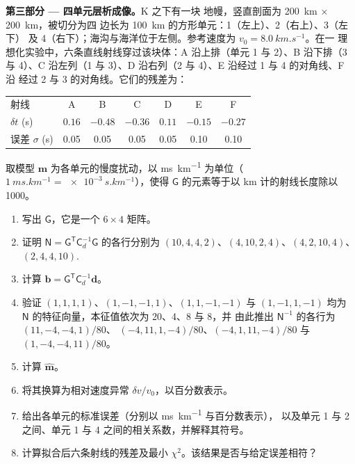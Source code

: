 \begin{problem}
\noindent\textbf{第三部分 --- 四单元层析成像。}K 之下有一块
地幔，竖直剖面为 \qty{200}{km} × \qty{200}{km}，被切分为四
边长为 \qty{100}{km} 的方形单元：1（左上）、2（右上）、3（左下）
及 4（右下）；海沟与海洋位于左侧。参考速度为 $v_0 = \qty{8.0}{km.s^{-1}}$。在一
理想化实验中，六条直线射线穿过该块体：A 沿上排（单元 1
与 2）、B 沿下排（3 与 4）、C 沿左列（1 与 3）、D
沿右列（2 与 4）、E 沿经过 1 与 4 的对角线、F 沿
经过 2 与 3 的对角线。它们的残差为：
\begin{center}
\small
\begin{tabular}{lcccccc}
\hline
射线 & A & B & C & D & E & F \\
$\delta t$ (\unit{s}) & $0.16$ & $-0.48$ & $-0.36$ & $0.11$ & $-0.15$ & $-0.27$ \\
误差 $\sigma$ (\unit{s}) & 0.05 & 0.05 & 0.05 & 0.05 & 0.10 & 0.10 \\
\hline
\end{tabular}
\end{center}
取模型 $\mathbf m$ 为各单元的慢度扰动，以
\unit{ms.km^{-1}} 为单位（$\qty{1}{ms.km^{-1}} = \qty{e-3}{s.km^{-1}}$），使得
$\mathsf G$ 的元素等于以 \unit{km} 计的射线长度除以 1000。
\begin{enumerate}[resume]
  \item 写出 $\mathsf G$，它是一个 $6\times4$ 矩阵。
  \item 证明 $\mathsf N = \mathsf G^{\mathsf T}\mathsf C_d^{-1}\mathsf G$
        的各行分别为 $(10, 4, 4, 2)$、$(4, 10, 2, 4)$、$(4, 2, 10, 4)$、
        $(2, 4, 4, 10)$.
  \item 计算 $\mathbf b = \mathsf G^{\mathsf T}\mathsf C_d^{-1}\mathbf d$。
  \item 验证 $(1,1,1,1)$、$(1,-1,-1,1)$、$(1,1,-1,-1)$ 与 $(1,-1,1,-1)$
        均为 $\mathsf N$ 的特征向量，本征值依次为 20、4、8 与 8，并
        由此推出 $\mathsf N^{-1}$ 的各行为 $(11, -4, -4, 1)/80$、
        $(-4, 11, 1, -4)/80$、$(-4, 1, 11, -4)/80$ 与 $(1, -4, -4, 11)/80$。
  \item 计算 $\hat{\mathbf m}$。
  \item 将其换算为相对速度异常 $\delta v/v_0$，以百分数表示。
  \item 给出各单元的标准误差（分别以 \unit{ms.km^{-1}} 与百分数表示），
        以及单元 1 与 2 之间、单元 1 与
        4 之间的相关系数，并解释其符号。
  \item 计算拟合后六条射线的残差及最小
        $\chi^2$。该结果是否与给定误差相符？
\end{enumerate}


\end{problem}
